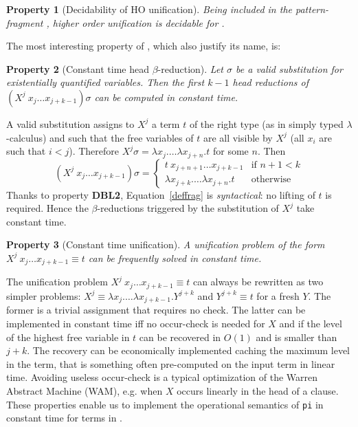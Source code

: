 \documentclass{llncs}
\newtheorem{myprop}{Property}
\begin{document}
\begin{myprop}[Decidability of HO unification]
Being \rff{} included in the pattern-fragment \Ll{}, higher order unification is
decidable for \rff{}.
\end{myprop}

The most interesting property of \rff{}, which also justify its name, is:

\begin{myprop}[Constant time head $\beta$-reduction]
Let $\sigma$ be a \emph{valid} substitution for existentially quantified variables. Then the first $k-1$ head reductions of $(X^j~x_j \ldots x_{j+k-1}) \sigma$ can be computed in constant time.
\end{myprop}

A valid substitution assigns to $X^j$ a term $t$ of the right type (as in simply
typed $\lambda$-calculus) and such that the free variables of $t$ are
all visible by $X^j$ (all $x_i$ are such that $i < j$).
Therefore $X^j \sigma = \lambda x_j. \ldots \lambda x_{j+n}.t$ for some $n$.
Then
\begin{equation}\label{deffrag}(X^j~x_j \ldots x_{j+k-1}) \sigma
 = \left\{ \begin{array}{ll}
t~x_{j+n+1} \ldots x_{j+k-1} & \mbox{if $n+1 < k$} \\
\lambda x_{j+k}. \ldots \lambda x_{j+n}.t & \mbox{otherwise}
      \end{array} \right.\end{equation}
Thanks to property \textbf{DBL2}, Equation~\ref{deffrag} is
\emph{syntactical}: no lifting of $t$ is required.
Hence the $\beta$-reductions triggered by the substitution of $X^j$ take
constant time.

\begin{myprop}[Constant time unification]
A unification problem of the form $X^j~x_j\ldots x_{j+k-1} \equiv t$
can be frequently solved in constant time.
\end{myprop}

The unification problem $X^j~x_j\ldots x_{j+k-1} \equiv t$ can always be
rewritten as two simpler problems: $X^j \equiv \lambda x_j. \ldots \lambda x_{j+k-1}. Y^{j+k}$ and $Y^{j+k} \equiv t$ for a fresh $Y$.
The former is a trivial assignment that requires no check.
The latter can be implemented in constant time iff no occur-check is needed
for $X$ and if the level of the highest free variable in $t$ can be recovered
in $O(1)$ and is smaller than $j+k$. The recovery can be economically
implemented caching the maximum level in the term, that is something often
pre-computed on the input term in linear time.
Avoiding useless occur-check is a typical optimization of the Warren Abstract
Machine (WAM), e.g. when $X$ occurs linearly in the head of a clause.
These properties enable us to implement the operational semantics of \verb+pi+
in constant time for terms in \rff{}.
\end{document}
